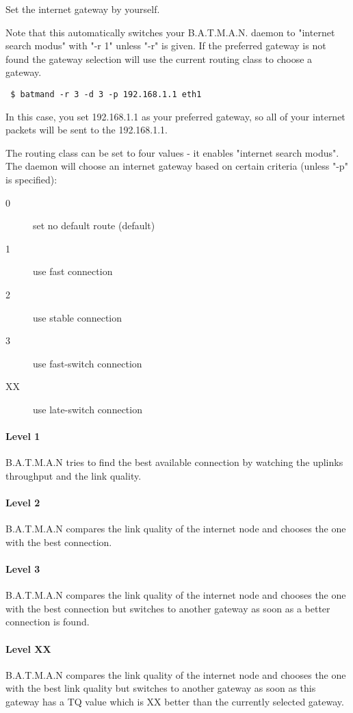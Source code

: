 Set the internet gateway by yourself.

Note that this automatically switches your B.A.T.M.A.N. daemon to "internet
search modus" with "-r 1" unless "-r" is given. If the preferred gateway is not
found the gateway selection will use the current routing class to choose a
gateway.

\begin{verbatim}
 $ batmand -r 3 -d 3 -p 192.168.1.1 eth1
\end{verbatim}
In this case, you set 192.168.1.1 as your preferred gateway, so all of your
internet packets will be sent to the 192.168.1.1.

The routing class can be set to four values - it enables "internet search
modus". The daemon will choose an internet gateway based on certain criteria
(unless "-p" is specified):
\begin{description}
\item[0] set no default route (default)
\item[1] use fast connection
\item[2] use stable connection
\item[3] use fast-switch connection
\item[XX] use late-switch connection
\end{description}

\paragraph*{Level 1}
B.A.T.M.A.N tries to find the best available connection by watching the uplinks
throughput and the link quality.

\paragraph*{Level 2}
B.A.T.M.A.N compares the link quality of the internet node and chooses the one
with the best connection.

\paragraph*{Level 3}
B.A.T.M.A.N compares the link quality of the internet node and chooses the one
with the best connection but switches to another gateway as soon as a better
connection is found.

\paragraph*{Level XX}
B.A.T.M.A.N compares the link quality of the internet node and chooses the one
with the best link quality but switches to another gateway as soon as this
gateway has a TQ value which is XX better than the currently selected gateway.


